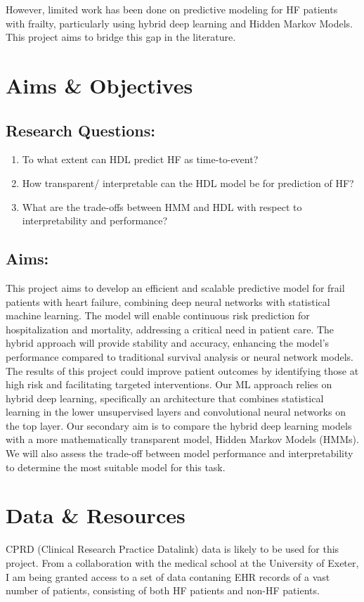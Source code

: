 \documentclass[%
 reprint,
 amsmath,amssymb,
 aps,
 nofootinbib
]{revtex4-2}
\theoremstyle{definition}
\begin{document}
However, limited work has been done on predictive modeling for HF patients with frailty, particularly using hybrid deep learning and Hidden Markov Models. This project aims to bridge this gap in the literature.\\

\section{\label{aimsobj}Aims \& Objectives}

\subsection{Research Questions:}
\begin{enumerate}
\item To what extent can HDL predict HF as time-to-event?
\item How transparent/ interpretable can the HDL model be for prediction of HF?
\item What are the trade-offs between HMM and HDL with respect to interpretability and performance?
\end{enumerate}

\subsection{Aims:}

This project aims to develop an efficient and scalable predictive model for frail patients with heart failure, combining deep neural networks with statistical machine learning. The model will enable continuous risk prediction for hospitalization and mortality, addressing a critical need in patient care. The hybrid approach will provide stability and accuracy, enhancing the model's performance compared to traditional survival analysis or neural network models. The results of this project could improve patient outcomes by identifying those at high risk and facilitating targeted interventions. Our ML approach relies on hybrid deep learning, specifically an architecture that combines statistical learning in the lower unsupervised layers and convolutional neural networks on the top layer. Our secondary aim is to compare the hybrid deep learning models with a more mathematically transparent model, Hidden Markov Models (HMMs). We will also assess the trade-off between model performance and interpretability to determine the most suitable model for this task.

\section{\label{datares}Data \& Resources}
CPRD (Clinical Research Practice Datalink) data is likely to be used for this project. From a collaboration with the medical school at the University of Exeter, I am being granted access to a set of data contaning EHR records of a vast number of patients, consisting of both HF patients and non-HF patients.
\end{document}
